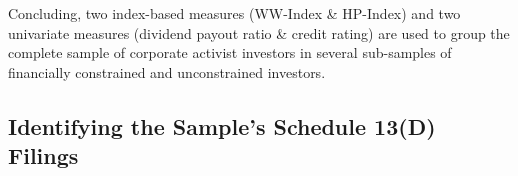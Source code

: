 \documentclass[12pt]{article}
\begin{document}

Concluding, two index-based measures (WW-Index \& HP-Index) and two univariate measures (dividend payout ratio \& credit rating) are used to group the complete sample of corporate activist investors in several sub-samples of financially constrained and unconstrained investors.

\subsection{Identifying the Sample's Schedule 13(D) Filings}
\end{document}

